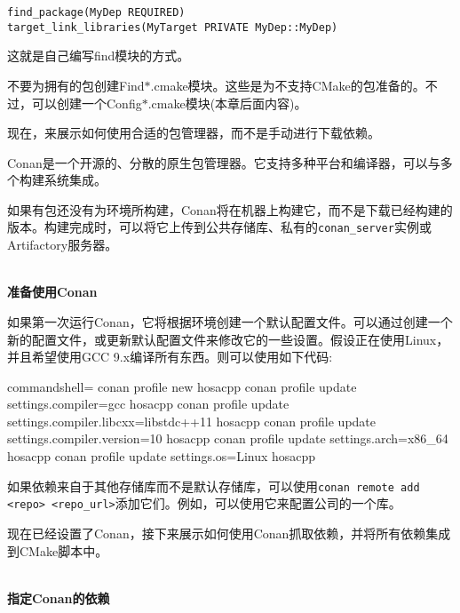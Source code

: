 \begin{lstlisting}[style=styleCMake]
find_package(MyDep REQUIRED)
target_link_libraries(MyTarget PRIVATE MyDep::MyDep)
\end{lstlisting}

这就是自己编写find模块的方式。

\begin{tcolorbox}[colback=blue!5!white,colframe=blue!75!black, title=Note]
\hspace*{0.7cm}不要为拥有的包创建Find$ \ast $.cmake模块。这些是为不支持CMake的包准备的。不过，可以创建一个Config$ \ast $.cmake模块(本章后面内容)。
\end{tcolorbox}

现在，来展示如何使用合适的包管理器，而不是手动进行下载依赖。


Conan是一个开源的、分散的原生包管理器。它支持多种平台和编译器，可以与多个构建系统集成。

如果有包还没有为环境所构建，Conan将在机器上构建它，而不是下载已经构建的版本。构建完成时，可以将它上传到公共存储库、私有的\texttt{conan\_server}实例或Artifactory服务器。

\hspace*{\fill} \\ %
\noindent
\textbf{准备使用Conan}

如果第一次运行Conan，它将根据环境创建一个默认配置文件。可以通过创建一个新的配置文件，或更新默认配置文件来修改它的一些设置。假设正在使用Linux，并且希望使用GCC 9.x编译所有东西。则可以使用如下代码:

\begin{tcblisting}{commandshell={}}
conan profile new hosacpp
conan profile update settings.compiler=gcc hosacpp
conan profile update settings.compiler.libcxx=libstdc++11 hosacpp
conan profile update settings.compiler.version=10 hosacpp
conan profile update settings.arch=x86_64 hosacpp
conan profile update settings.os=Linux hosacpp
\end{tcblisting}

如果依赖来自于其他存储库而不是默认存储库，可以使用\texttt{conan remote add <repo> <repo\_url>}添加它们。例如，可以使用它来配置公司的一个库。

现在已经设置了Conan，接下来展示如何使用Conan抓取依赖，并将所有依赖集成到CMake脚本中。

\hspace*{\fill} \\ %
\noindent
\textbf{指定Conan的依赖}

